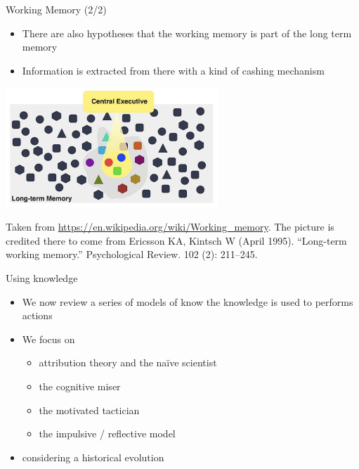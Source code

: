 \documentclass{beamer}
\begin{document}
\begin{frame}
{\centerline{Working Memory (2/2)}}
\begin{itemize}
    \item There are also hypotheses that the working memory is part of the long term memory
    \item Information is extracted from there with a kind of cashing mechanism
\end{itemize} 

\begin{center}

 \includegraphics[width=8cm]{P2023.AIBCCSS.KnowledgeAcquisitionRetentionUse/WorkingMemoryPartOfLongTermMemory.jpg}
 
 \end{center}

\begin{center}
    \tiny{Taken from \url{https://en.wikipedia.org/wiki/Working_memory}. The picture is credited there to come from Ericsson KA, Kintsch W (April 1995). ``Long-term working memory.'' Psychological Review. 102 (2): 211–245. }
\end{center}

\end{frame}



\begin{frame}
{\centerline{Using knowledge}}
\begin{itemize}
    \item We now review a series of models of know the knowledge is used to performs actions
    \item We focus on
    \begin{itemize}
        \item attribution theory and the na\"{i}ve scientist
        \item the cognitive miser 
        \item the motivated tactician
        \item the impulsive / reflective model
    \end{itemize}
    \item considering a historical evolution
\end{itemize} 
\end{frame}
\end{document}
